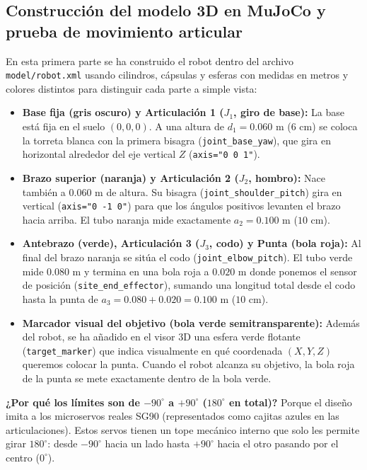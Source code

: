 \documentclass[11pt,a4paper]{article}
\begin{document}
\subsection{Construcción del modelo 3D en MuJoCo y prueba de movimiento articular}
En esta primera parte se ha construido el robot dentro del archivo \texttt{model/robot.xml} usando cilindros, cápsulas y esferas con medidas en metros y colores distintos para distinguir cada parte a simple vista:
\begin{itemize}
    \item \textbf{Base fija (gris oscuro) y Articulación 1 ($J_1$, giro de base):} La base está fija en el suelo $(0,0,0)$. A una altura de $d_1 = 0.060\text{ m}$ ($6\text{ cm}$) se coloca la torreta blanca con la primera bisagra (\texttt{joint\_base\_yaw}), que gira en horizontal alrededor del eje vertical $Z$ (\texttt{axis="0 0 1"}).
    \item \textbf{Brazo superior (naranja) y Articulación 2 ($J_2$, hombro):} Nace también a $0.060\text{ m}$ de altura. Su bisagra (\texttt{joint\_shoulder\_pitch}) gira en vertical (\texttt{axis="0 -1 0"}) para que los ángulos positivos levanten el brazo hacia arriba. El tubo naranja mide exactamente $a_2 = 0.100\text{ m}$ ($10\text{ cm}$).
    \item \textbf{Antebrazo (verde), Articulación 3 ($J_3$, codo) y Punta (bola roja):} Al final del brazo naranja se sitúa el codo (\texttt{joint\_elbow\_pitch}). El tubo verde mide $0.080\text{ m}$ y termina en una bola roja a $0.020\text{ m}$ donde ponemos el sensor de posición (\texttt{site\_end\_effector}), sumando una longitud total desde el codo hasta la punta de $a_3 = 0.080 + 0.020 = 0.100\text{ m}$ ($10\text{ cm}$).
    \item \textbf{Marcador visual del objetivo (bola verde semitransparente):} Además del robot, se ha añadido en el visor 3D una esfera verde flotante (\texttt{target\_marker}) que indica visualmente en qué coordenada $(X, Y, Z)$ queremos colocar la punta. Cuando el robot alcanza su objetivo, la bola roja de la punta se mete exactamente dentro de la bola verde.
\end{itemize}

\textbf{¿Por qué los límites son de $-90^\circ$ a $+90^\circ$ ($180^\circ$ en total)?}
Porque el diseño imita a los microservos reales SG90 (representados como cajitas azules en las articulaciones). Estos servos tienen un tope mecánico interno que solo les permite girar $180^\circ$: desde $-90^\circ$ hacia un lado hasta $+90^\circ$ hacia el otro pasando por el centro ($0^\circ$).
\end{document}
